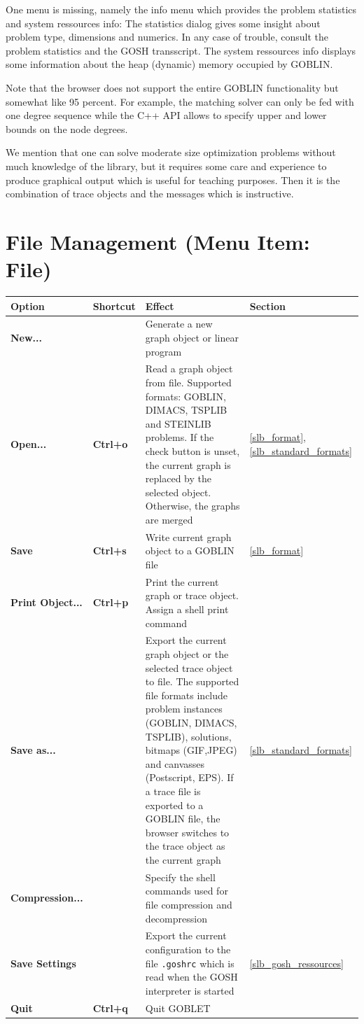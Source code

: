 \documentclass[a4paper,11pt,twoside]{book}
\begin{document}
\begin{multicols}{2}
One menu is missing, namely
the info menu which provides the problem statistics and system ressources info:
The statistics dialog gives some insight about problem type, dimensions and
numerics. In any case of trouble, consult the problem statistics and the GOSH
transscript. The system ressources info displays some information about the
heap (dynamic) memory occupied by GOBLIN.

Note that the browser does not support the entire GOBLIN functionality but
somewhat like 95 percent. For example, the matching solver can only be fed
with one degree sequence while the C++ API allows to specify upper and
lower bounds on the node degrees.

We mention that one can solve moderate size optimization problems without much
knowledge of the library, but it requires some care and experience to produce
graphical output which is useful for teaching purposes. Then it is the
combination of trace objects and the messages which is instructive.

\end{multicols}
\pagestyle{fancy}

\vfill
\section{File Management (Menu Item: File)}

\begin{tabular}{p{3cm}|p{2cm}|p{18cm}|p{1.5cm}} 
\large\bf Option & \large\bf Shortcut & \large\bf Effect & \large\bf Section \\
[1mm] \hline \hline
\bf New... & &
    Generate a new graph object or linear program \\ \hline
\bf Open... & \bf Ctrl+o &
    Read a graph object from file. Supported formats:
    GOBLIN, DIMACS, TSPLIB and STEINLIB problems.
    If the check button is unset, the current graph is replaced by the selected
    object. Otherwise, the graphs are merged &
    \ref{slb_format}, \ref{slb_standard_formats} \\ \hline
\bf Save & \bf Ctrl+s &
    Write current graph object to a GOBLIN file &
    \ref{slb_format} \\ \hline
\bf Print Object... & \bf Ctrl+p &
    Print the current graph or trace object. Assign a shell print command \\ \hline
\bf Save as... & &
    Export the current graph object or the selected trace object to file.
    The supported file formats include problem instances (GOBLIN, DIMACS,
    TSPLIB), solutions, bitmaps (GIF,JPEG) and canvasses (Postscript, EPS).
    If a trace file is exported to a GOBLIN file, the browser switches to
    the trace object as the current graph &
    \ref{slb_standard_formats} \\ \hline
\bf Compression... & &
    Specify the shell commands used for file compression and decompression \\ \hline
\bf Save Settings & &
    Export the current configuration to the file \verb/.goshrc/ which is
    read when the GOSH interpreter is started &
    \ref{slb_gosh_ressources}  \\ \hline
\bf Quit & \bf Ctrl+q &
    Quit GOBLET
\end{tabular}
\end{document}
